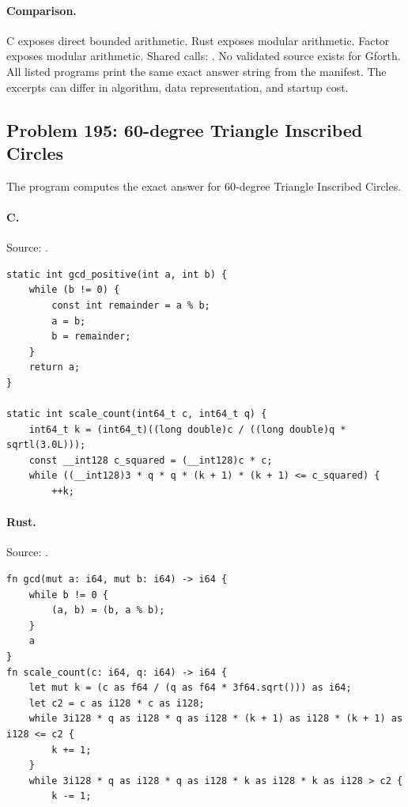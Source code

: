 \paragraph{Comparison.}
C exposes direct bounded arithmetic. Rust exposes modular arithmetic. Factor exposes modular arithmetic. Shared calls: \texttt{}.
No validated source exists for Gforth.
All listed programs print the same exact answer string from the manifest. The excerpts can differ in algorithm, data representation, and startup cost.

\subsection{Problem 195: 60-degree Triangle Inscribed Circles}
\label{walkthrough:p195}
The program computes the exact answer for 60-degree Triangle Inscribed Circles.

\paragraph{C.} Source: .
\begin{lstlisting}
static int gcd_positive(int a, int b) {
    while (b != 0) {
        const int remainder = a % b;
        a = b;
        b = remainder;
    }
    return a;
}

static int scale_count(int64_t c, int64_t q) {
    int64_t k = (int64_t)((long double)c / ((long double)q * sqrtl(3.0L)));
    const __int128 c_squared = (__int128)c * c;
    while ((__int128)3 * q * q * (k + 1) * (k + 1) <= c_squared) {
        ++k;
\end{lstlisting}

\paragraph{Rust.} Source: .
\begin{lstlisting}
fn gcd(mut a: i64, mut b: i64) -> i64 {
    while b != 0 {
        (a, b) = (b, a % b);
    }
    a
}
fn scale_count(c: i64, q: i64) -> i64 {
    let mut k = (c as f64 / (q as f64 * 3f64.sqrt())) as i64;
    let c2 = c as i128 * c as i128;
    while 3i128 * q as i128 * q as i128 * (k + 1) as i128 * (k + 1) as i128 <= c2 {
        k += 1;
    }
    while 3i128 * q as i128 * q as i128 * k as i128 * k as i128 > c2 {
        k -= 1;
\end{lstlisting}

